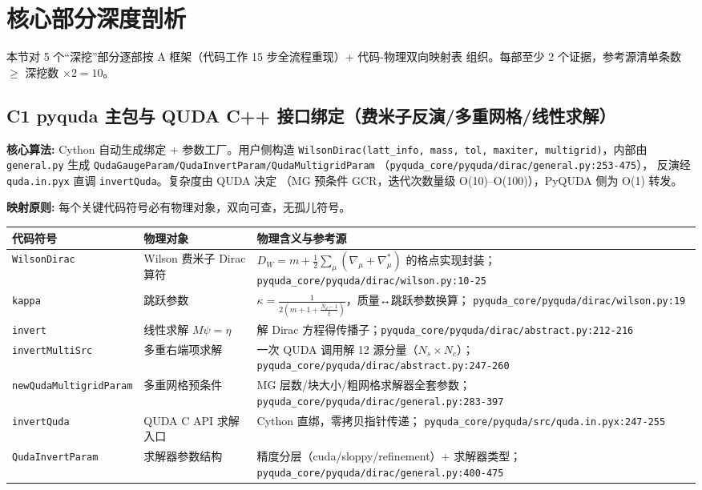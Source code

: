 \documentclass[UTF8]{ctexart}
\begin{document}
\section{核心部分深度剖析}
本节对 5 个“深挖”部分逐部按 A 框架（代码工作 15 步全流程重现）+ 代码-物理双向映射表
组织。每部至少 2 个证据，参考源清单条数 $\ge$ 深挖数 $\times 2 = 10$。

\subsection{C1 pyquda 主包与 QUDA C++ 接口绑定（费米子反演/多重网格/线性求解）}

\begin{algobox}
\textbf{核心算法:} Cython 自动生成绑定 + 参数工厂。用户侧构造
\texttt{WilsonDirac(latt\_info, mass, tol, maxiter, multigrid)}，内部由
\texttt{general.py} 生成 \texttt{QudaGaugeParam/QudaInvertParam/QudaMultigridParam}
（\texttt{\nolinkurl{pyquda_core/pyquda/dirac/general.py:253-475}}），
反演经 \texttt{quda.in.pyx} 直调 \texttt{invertQuda}。复杂度由 QUDA 决定
（MG 预条件 GCR，迭代次数量级 O(10)–O(100)），PyQUDA 侧为 O(1) 转发。
\end{algobox}

\begin{mapbox}
\textbf{映射原则:} 每个关键代码符号必有物理对象，双向可查，无孤儿符号。
\end{mapbox}
\begin{xltabular}{\textwidth}{llX}
\toprule
\textcolor{map}{代码符号} & 物理对象 & 物理含义与参考源 \\
\midrule
\endhead
\texttt{WilsonDirac} & Wilson 费米子 Dirac 算符 &
$D_{W}=m+\frac{1}{2}\sum_\mu(\nabla_\mu+\nabla^*_\mu)$ 的格点实现封装；
\texttt{\nolinkurl{pyquda_core/pyquda/dirac/wilson.py:10-25}} \\
\texttt{kappa} & 跳跃参数 &
$\kappa=\frac{1}{2(m+1+\frac{N_d-1}{\xi})}$，质量↔跳跃参数换算；
\texttt{\nolinkurl{pyquda_core/pyquda/dirac/wilson.py:19}} \\
\texttt{invert} & 线性求解 $M\psi=\eta$ &
解 Dirac 方程得传播子；\texttt{\nolinkurl{pyquda_core/pyquda/dirac/abstract.py:212-216}} \\
\texttt{invertMultiSrc} & 多重右端项求解 &
一次 QUDA 调用解 12 源分量（$N_s\times N_c$）；
\texttt{\nolinkurl{pyquda_core/pyquda/dirac/abstract.py:247-260}} \\
\texttt{newQudaMultigridParam} & 多重网格预条件 &
MG 层数/块大小/粗网格求解器全套参数；
\texttt{\nolinkurl{pyquda_core/pyquda/dirac/general.py:283-397}} \\
\texttt{invertQuda} & QUDA C API 求解入口 &
Cython 直绑，零拷贝指针传递；
\texttt{\nolinkurl{pyquda_core/pyquda/src/quda.in.pyx:247-255}} \\
\texttt{QudaInvertParam} & 求解器参数结构 &
精度分层（cuda/sloppy/refinement）+ 求解器类型；
\texttt{\nolinkurl{pyquda_core/pyquda/dirac/general.py:400-475}} \\
\bottomrule
\end{xltabular}
\end{document}
